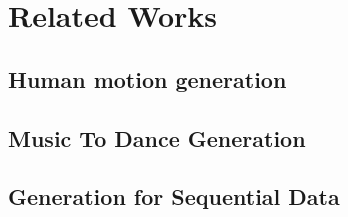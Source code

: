 \section{Related Works}
\subsection{Human motion generation}

\subsection{Music To Dance Generation}

\subsection{Generation for Sequential Data}

